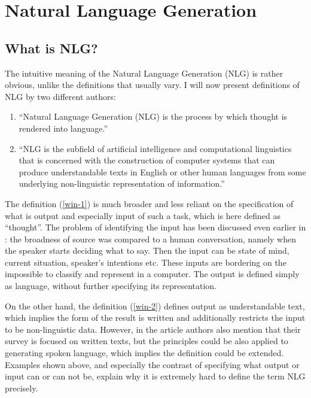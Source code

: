 \chapter{Natural Language Generation}\label{chap:nlg}

\section{What is NLG?}
The intuitive meaning of the Natural Language Generation (NLG) is rather obvious, unlike the definitions that usually vary. I will now present definitions of NLG by two different authors:
\begin{enumerate}
	\item “Natural Language Generation (NLG) is the process by which thought is rendered into language.”\label{win-1}\cite{mcdonald2010natural}
	\item “NLG is the subfield of artificial intelligence and computational linguistics that is concerned with the construction of computer systems that can produce understandable texts in English or other human languages from some underlying non-linguistic representation of information.”\label{win-2}\cite{reiter1997building}
\end{enumerate}

The definition (\ref{win-1}) is much broader and less reliant on the specification of what is output and especially input of such a task, which is here defined as “thought”. The problem of identifying the input has been discussed even earlier in \cite{mcdonald1993issues}: the broadness of source was compared to a human conversation, namely when the speaker starts deciding what to say. Then the input can be state of mind, current situation, speaker’s intentions etc. These inputs are bordering on the impossible to classify and represent in a computer. The output is defined simply as language, without further specifying its representation. 

On the other hand, the definition (\ref{win-2}) defines output as understandable text, which implies the form of the result is written and additionally restricts the input to be non-linguistic data. However, in the article authors also mention that their survey is focused on written texts, but the principles could be also applied to generating spoken language, which implies the definition could be extended. Examples shown above, and especially the contrast of specifying what output or input can or can not be, explain why it is extremely hard to define the term NLG precisely.
 
